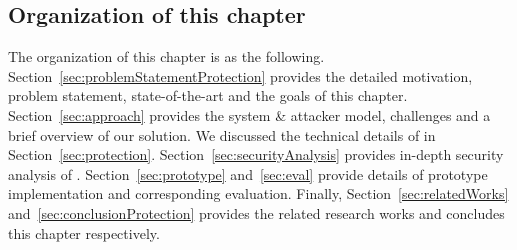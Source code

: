 \subsection{Organization of this chapter} The organization of this chapter is as the following. Section~\ref{sec:problemStatementProtection} provides the detailed motivation, problem statement, state-of-the-art and the goals of this chapter. Section~\ref{sec:approach} provides the system \& attacker model, challenges and a brief overview of our solution. We discussed the technical details of \name in Section~\ref{sec:protection}. Section~\ref{sec:securityAnalysis} provides in-depth security analysis of \name. Section~\ref{sec:prototype} and~\ref{sec:eval} provide details of \name prototype implementation and corresponding evaluation. Finally, Section~\ref{sec:relatedWorks} and~\ref{sec:conclusionProtection} provides the related research works and concludes this chapter respectively.
